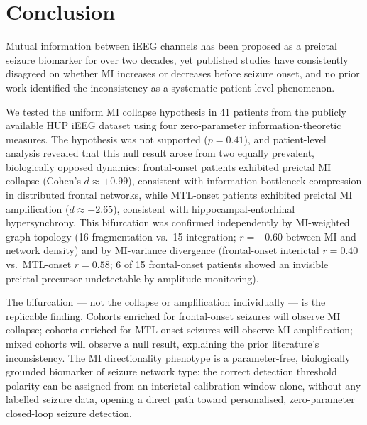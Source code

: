 \documentclass[final,5p,times,twocolumn]{elsarticle}
\begin{document}
\section{Conclusion}
\label{sec:conclusion}

Mutual information between iEEG channels has been proposed as a
preictal seizure biomarker for over two decades, yet published studies
have consistently disagreed on whether MI increases or decreases before
seizure onset, and no prior work identified the inconsistency as a
systematic patient-level phenomenon.

We tested the uniform MI collapse hypothesis in 41 patients from the
publicly available HUP iEEG dataset using four zero-parameter
information-theoretic measures.
%
The hypothesis was not supported ($p = 0.41$), and patient-level
analysis revealed that this null result arose from two equally prevalent,
biologically opposed dynamics: frontal-onset patients exhibited preictal
MI collapse (Cohen's $d \approx +0.99$), consistent with information
bottleneck compression in distributed frontal networks, while MTL-onset
patients exhibited preictal MI amplification ($d \approx -2.65$),
consistent with hippocampal-entorhinal hypersynchrony.
%
This bifurcation was confirmed independently by MI-weighted graph
topology (16 fragmentation vs.\ 15 integration; $r = -0.60$ between MI
and network density) and by MI-variance divergence (frontal-onset
interictal $r = 0.40$ vs.\ MTL-onset $r = 0.58$; 6 of 15
frontal-onset patients showed an invisible preictal precursor
undetectable by amplitude monitoring).

The bifurcation --- not the collapse or amplification individually ---
is the replicable finding.
%
Cohorts enriched for frontal-onset seizures will observe MI collapse;
cohorts enriched for MTL-onset seizures will observe MI amplification;
mixed cohorts will observe a null result, explaining the prior
literature's inconsistency.
%
The MI directionality phenotype is a parameter-free, biologically
grounded biomarker of seizure network type: the correct detection
threshold polarity can be assigned from an interictal calibration window
alone, without any labelled seizure data, opening a direct path toward
personalised, zero-parameter closed-loop seizure detection.
\end{document}
